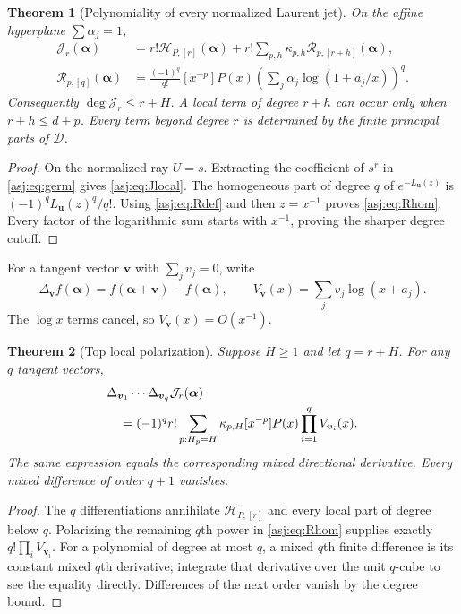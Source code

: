 \documentclass[11pt]{article}
\numberwithin{equation}{section}
\newtheorem{theorem}{Theorem}[section]
\theoremstyle{definition}\newtheorem{definition}[theorem]{Definition}
\theoremstyle{remark}\newtheorem{remark}[theorem]{Remark}\newtheorem{example}[theorem]{Example}
\newcommand{\D}{\mathscr D}\newcommand{\calH}{\mathcal H}\newcommand{\calR}{\mathcal R}
\newcommand{\calJ}{\mathcal J}\newcommand{\calZ}{\mathcal Z}
\begin{document}
\begin{theorem}[Polynomiality of every normalized Laurent jet]
\label{asj:thm:polynomial}
On the affine hyperplane $\sum\alpha_j=1$,
\begin{align}
 \calJ_r(\boldsymbol\alpha)
  &=r!\calH_{P,[r]}(\boldsymbol\alpha)
      +r!\sum_{p,h}\kappa_{p,h}
                       \calR_{p,[r+h]}(\boldsymbol\alpha),\label{asj:eq:Jlocal}\\
 \calR_{p,[q]}(\boldsymbol\alpha)
  &=\frac{(-1)^q}{q!}[x^{-p}]P(x)
       \left(\sum_j\alpha_j\log(1+a_j/x)\right)^q.
 \label{asj:eq:Rhom}
\end{align}
Consequently $\deg\calJ_r\le r+H$. A local term of degree $r+h$ can
occur only when $r+h\le d+p$. Every term beyond degree $r$ is determined
by the finite principal parts of $\D$.
\end{theorem}
\begin{proof}
On the normalized ray $U=s$. Extracting the coefficient of $s^r$ in
\eqref{asj:eq:germ} gives \eqref{asj:eq:Jlocal}. The homogeneous part of degree
$q$ of $e^{-L_{\boldsymbol u}(z)}$ is
$(-1)^qL_{\boldsymbol u}(z)^q/q!$. Using \eqref{asj:eq:Rdef} and then
$z=x^{-1}$ proves \eqref{asj:eq:Rhom}. Every factor of the logarithmic
sum starts with $x^{-1}$, proving the sharper degree cutoff.
\end{proof}

For a tangent vector $\boldsymbol v$ with $\sum_jv_j=0$, write
\[
 \Delta_{\boldsymbol v}f(\boldsymbol\alpha)
     =f(\boldsymbol\alpha+\boldsymbol v)-f(\boldsymbol\alpha),
 \qquad V_{\boldsymbol v}(x)=\sum_jv_j\log(x+a_j).
\]
The $\log x$ terms cancel, so $V_{\boldsymbol v}(x)=O(x^{-1})$.

\begin{theorem}[Top local polarization]\label{asj:thm:top}
Suppose $H\ge1$ and let $q=r+H$. For any $q$ tangent vectors,
\begin{align}\label{asj:eq:top}
 &\Delta_{\boldsymbol v_1}\cdots\Delta_{\boldsymbol v_q}
          \calJ_r(\boldsymbol\alpha)\notag\\
 &\quad=(-1)^q r!\sum_{p:H_p=H}\kappa_{p,H}
           [x^{-p}]P(x)\prod_{i=1}^q V_{\boldsymbol v_i}(x).
\end{align}
The same expression equals the corresponding mixed directional
derivative. Every mixed difference of order $q+1$ vanishes.
\end{theorem}
\begin{proof}
The $q$ differentiations annihilate $\calH_{P,[r]}$ and every local
part of degree below $q$. Polarizing the remaining $q$th power in
\eqref{asj:eq:Rhom} supplies exactly $q!\prod_i V_{\boldsymbol v_i}$.
For a polynomial of degree at most $q$, a mixed $q$th finite difference
is its constant mixed $q$th derivative; integrate that derivative over
the unit $q$-cube to see the equality directly. Differences of the
next order vanish by the degree bound.
\end{proof}
\end{document}
